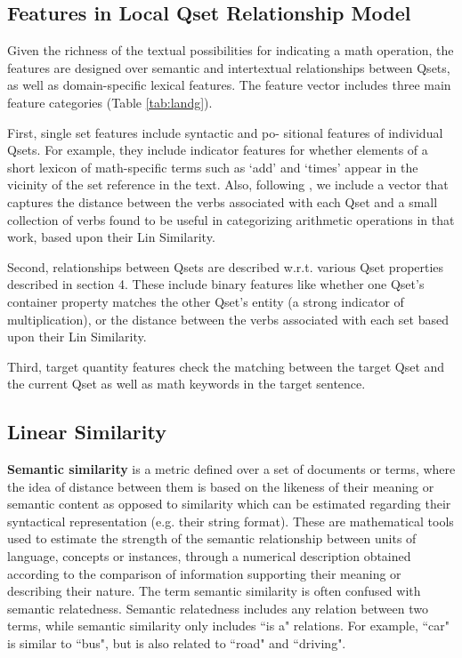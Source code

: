 \documentclass[document.tex]{subfiles}
\begin{document}
\subsection{Features in Local Qset Relationship Model}
Given the richness of the textual possibilities for indicating a math operation, the features are designed over semantic and intertextual relationships between Qsets, as well as domain-specific lexical features. The feature vector includes three main feature categories (Table \ref{tab:landg}).

First, single set features include syntactic and po-
sitional features of individual Qsets. For example,
they include indicator features for whether elements
of a short lexicon of math-specific terms such as ‘add’ and ‘times’ appear in the vicinity of the set
reference in the text. Also, following \cite{1}, we include a vector that captures the distance between the verbs associated with each Qset and a small collection of verbs found to be useful
in categorizing arithmetic operations in that work,
based upon their Lin Similarity\cite{31}.

Second, relationships between Qsets are described w.r.t. various Qset properties described in section 4. These include binary features like whether one Qset’s container property matches the other Qset’s entity (a strong indicator of multiplication), or
the distance between the verbs associated with each
set based upon their Lin Similarity.

Third, target quantity features check the matching
between the target Qset and the current Qset as well
as math keywords in the target sentence.
\subsection{Linear Similarity}

\noindent \textbf{Semantic similarity} is a metric defined over a set of documents or terms, where the idea of distance between them is based on the likeness of their meaning or semantic content as opposed to similarity which can be estimated regarding their syntactical representation (e.g. their string format). These are mathematical tools used to estimate the strength of the semantic relationship between units of language, concepts or instances, through a numerical description obtained according to the comparison of information supporting their meaning or describing their nature. The term semantic similarity is often confused with semantic relatedness. Semantic relatedness includes any relation between two terms, while semantic similarity only includes ``is a" relations. For example, ``car" is similar to ``bus", but is also related to ``road" and ``driving".
\end{document}
